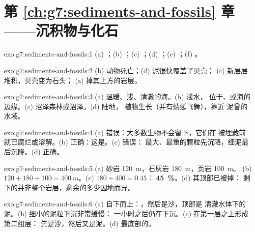 \section*{第 \ref{ch:g7:sediments-and-fossils} 章——沉积物与化石}

\begin{solution}{exo:g7:sediments-and-fossils:1}
(a) ；(b) ；(c) ；(d) ；(e) ；(f)
。
\end{solution}

\begin{solution}{exo:g7:sediments-and-fossils:2}
(b) 动物死亡；(d) 泥很快覆盖了贝壳；
(c) 新层层堆积，贝壳变为石头；
(a) 掉其上方的岩层。
\end{solution}

\begin{solution}{exo:g7:sediments-and-fossils:3}
(a) 温暖、浅、清澈的海。(b) 浅水，
位于、或海的边缘。(c) 沼泽森林或沼泽。(d) 陆地，
植物生长（并有蜻蜓飞舞），靠近
泥曾的水域。
\end{solution}

\begin{solution}{exo:g7:sediments-and-fossils:4}
(a) 错误：大多数生物不会留下，它们在
被埋藏前就已腐烂或溶解。(b) 正确：这是。(c) 错误：
最大、最重的颗粒先沉降，细泥最后沉降。(d) 正确。
\end{solution}

\begin{solution}{exo:g7:sediments-and-fossils:5}
(a) 砂岩 \qty{120}{m}，石灰岩 \qty{180}{m}，页岩 \qty{100}{m}。
(b) $120 + 180 + 100 = \qty{400}{m}$。(c) $180 \div 400 = 0.45$：
\textbf{45~\%}。(d) 其顶部已被掉：
剩下的并非整个岩层，剩余的多少因地而异。
\end{solution}

\begin{solution}{exo:g7:sediments-and-fossils:6}
(a) 自下而上：，然后是沙，顶部是
清澈水体下的泥。(b) 细小的泥粒下沉非常缓慢：
一小时之后仍在下沉。(c) 在第一层之上形成第二组层：
先是沙，然后又是泥。(d) 最底部的。
\end{solution}

